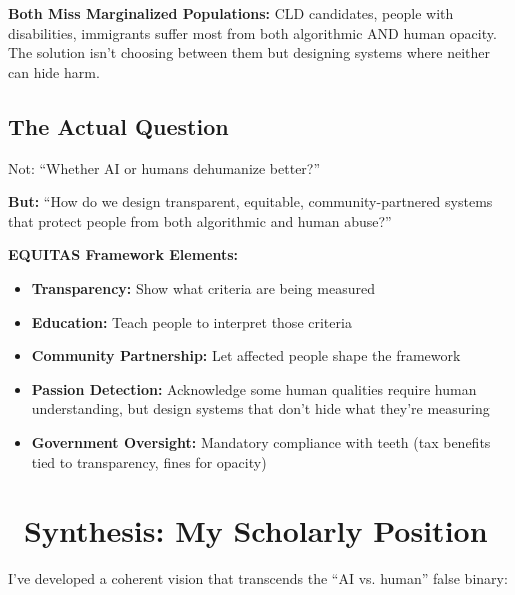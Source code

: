 \documentclass[12pt,letterpaper]{article}
\begin{document}
\textbf{Both Miss Marginalized Populations:} CLD candidates, people with disabilities, immigrants suffer most from both algorithmic AND human opacity. The solution isn't choosing between them but designing systems where neither can hide harm.

\subsection*{The Actual Question}

\begin{puzzleplan}
Not: ``Whether AI or humans dehumanize better?''

\textbf{But:} ``How do we design transparent, equitable, community-partnered systems that protect people from both algorithmic and human abuse?''

\textbf{EQUITAS Framework Elements:}
\begin{itemize}[leftmargin=*,noitemsep]
    \item \textbf{Transparency:} Show what criteria are being measured
    \item \textbf{Education:} Teach people to interpret those criteria
    \item \textbf{Community Partnership:} Let affected people shape the framework
    \item \textbf{Passion Detection:} Acknowledge some human qualities require human understanding, but design systems that don't hide what they're measuring
    \item \textbf{Government Oversight:} Mandatory compliance with teeth (tax benefits tied to transparency, fines for opacity)
\end{itemize}
\end{puzzleplan}

\newpage
\section*{\color{primaryblue}\faLightbulb\ Synthesis: My Scholarly Position}

I've developed a coherent vision that transcends the ``AI vs. human'' false binary:
\end{document}
